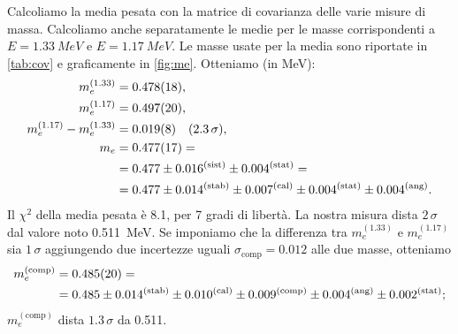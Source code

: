 Calcoliamo la media pesata con la matrice di covarianza delle varie misure di massa.
Calcoliamo anche separatamente le medie per le masse corrispondenti a $E=\SI{1.33}{MeV}$ e $E=\SI{1.17}{MeV}$.
Le masse usate per la media sono riportate in \autoref{tab:cov} e graficamente in \autoref{fig:me}.
Otteniamo (in \si{MeV}):
\begin{align*}
	m_e^{(1.33)}                &= \num{0.478 \pm 0.018}  ,    \\
	m_e^{(1.17)}                &= \num{0.497 \pm 0.020}  ,    \\
	m_e^{(1.17)} - m_e^{(1.33)} &= \num{0.019 \pm 0.008}  \quad(2.3\,\sigma),   \\
	m_e                         &= \num{0.477 \pm 0.017} = \\
	                            &=      0.477 \pm 0.016^{(\text{sist})} \pm 0.004^{(\text{stat})} = \\
										 &=      0.477 \pm 0.014^{(\text{stab})} \pm 0.007^{(\text{cal})} \pm 0.004^{(\text{stat})} \pm 0.004^{(\text{ang})}.
\end{align*}
Il $\chi^2$ della media pesata è 8.1, per 7 gradi di libertà.
La nostra misura dista $2\,\sigma$ dal valore noto \SI{0.511}{MeV}.
Se imponiamo che la differenza tra $m_e^{(1.33)}$ e $m_e^{(1.17)}$ sia $1\,\sigma$
aggiungendo due incertezze uguali $\sigma_\text{comp}=0.012$ alle due masse, otteniamo
\begin{align*}
	m_e^{(\text{comp})}                &= \num{0.485 \pm 0.020} = \\
	                            &=      0.485 \pm 0.014^{(\text{stab})} \pm 0.010^{(\text{cal})} \pm 0.009^{(\text{comp})} \pm 0.004^{(\text{ang})} \pm 0.002^{(\text{stat})};
\end{align*}
$m_e^{(\text{comp})}$ dista $1.3\,\sigma$ da 0.511.
